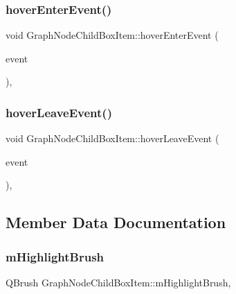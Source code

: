 \subsubsection{\texorpdfstring{hoverEnterEvent()}{hoverEnterEvent()}}
{\footnotesize\ttfamily void Graph\+Node\+Child\+Box\+Item\+::hover\+Enter\+Event (\begin{DoxyParamCaption}\item[{Q\+Graphics\+Scene\+Hover\+Event $\ast$}]{event }\end{DoxyParamCaption})\hspace{0.3cm}{\ttfamily [protected]}, {\ttfamily [virtual]}}

\mbox{\label{class_graph_node_child_box_item_a1dcc8d6951b22511a196e31383d0347a}} 
\subsubsection{\texorpdfstring{hoverLeaveEvent()}{hoverLeaveEvent()}}
{\footnotesize\ttfamily void Graph\+Node\+Child\+Box\+Item\+::hover\+Leave\+Event (\begin{DoxyParamCaption}\item[{Q\+Graphics\+Scene\+Hover\+Event $\ast$}]{event }\end{DoxyParamCaption})\hspace{0.3cm}{\ttfamily [protected]}, {\ttfamily [virtual]}}



\subsection{Member Data Documentation}
\mbox{\label{class_graph_node_child_box_item_a90f1a634785dc329ffef3e62b0098c5d}} 
\subsubsection{\texorpdfstring{mHighlightBrush}{mHighlightBrush}}
{\footnotesize\ttfamily Q\+Brush Graph\+Node\+Child\+Box\+Item\+::m\+Highlight\+Brush\hspace{0.3cm}{\ttfamily [static]}, {\ttfamily [protected]}}

